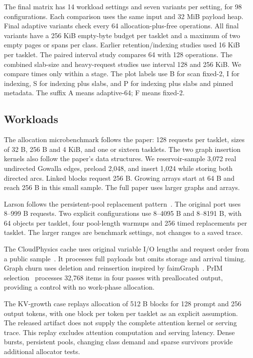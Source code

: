 \documentclass[conference]{IEEEtran}
\begin{document}
The final matrix has 14 workload settings and seven variants per setting, for 98 configurations. Each comparison uses the same input and 32 MiB payload heap. Final adaptive variants check every 64 allocation-plus-free operations. All final variants have a 256 KiB empty-byte budget per tasklet and a maximum of two empty pages or spans per class. Earlier retention/indexing studies used 16 KiB per tasklet. The paired interval study compares 64 with 128 operations. The combined slab-size and heavy-request studies use interval 128 and 256 KiB. We compare times only within a stage.
The plot labels use B for scan fixed-2, I for indexing, S for indexing plus slabs, and P for indexing plus slabs and pinned metadata. The suffix A means adaptive-64; F means fixed-2.

\subsection{Workloads}
The allocation microbenchmark follows the paper: 128 requests per tasklet, sizes of 32 B, 256 B and 4 KiB, and one or sixteen tasklets. The two graph insertion kernels also follow the paper's data structures. We reservoir-sample 3,072 real undirected Gowalla edges, preload 2,048, and insert 1,024 while storing both directed arcs. Linked blocks request 256 B. Growing arrays start at 64 B and reach 256 B in this small sample. The full paper uses larger graphs and arrays.

Larson follows the persistent-pool replacement pattern~\cite{larson,mimalloc}. The original port uses 8--999 B requests. Two explicit configurations use 8--4095 B and 8--8191 B, with 64 objects per tasklet, four pool-length warmups and 256 timed replacements per tasklet. The larger ranges are benchmark settings, not changes to a saved trace.

The CloudPhysics cache uses original variable I/O lengths and request order from a public sample~\cite{cloud}. It processes full payloads but omits storage and arrival timing. Graph churn uses deletion and reinsertion inspired by faimGraph~\cite{faim}. PrIM selection~\cite{prim} processes 32,768 items in four passes with preallocated output, providing a control with no work-phase allocation.

The KV-growth case replays allocation of 512 B blocks for 128 prompt and 256 output tokens, with one block per token per tasklet as an explicit assumption. The released artifact does not supply the complete attention kernel or serving trace. This replay excludes attention computation and serving latency. Dense bursts, persistent pools, changing class demand and sparse survivors provide additional allocator tests.
\end{document}
